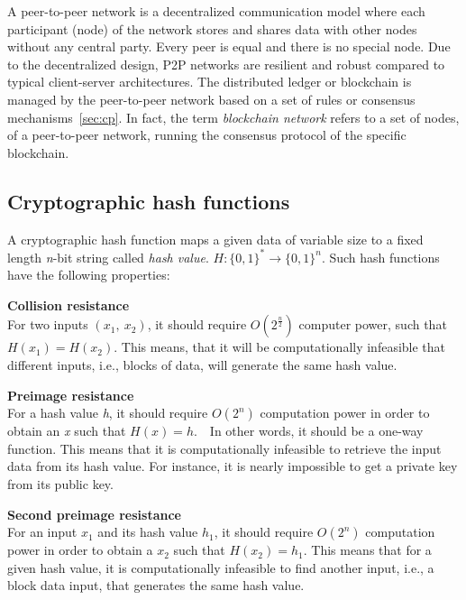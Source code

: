 \documentclass[11pt,a4paper]{report}
\begin{document}
A peer-to-peer network\cite{book:masteringBTCp2p}\cite{wiki:Peer-to-peer} is a decentralized communication model where each participant (node) of the network stores and shares data with other nodes without any central party. Every peer is equal and there is no special node. Due to the decentralized design, P2P networks are resilient and robust compared to typical client-server architectures. The distributed ledger or blockchain is managed by the peer-to-peer network based on a set of rules or consensus mechanisms~\ref{sec:cp}. In fact, the term \emph{blockchain network} refers to a set of nodes, of a peer-to-peer network, running the consensus protocol of the specific blockchain.


\subsection{Cryptographic hash functions}\label{sec:chf}
A cryptographic hash function\cite{chf}\cite{book:chf} maps a given data of variable size to a fixed length \emph{n}-bit string called \textit{hash value}. $ H : \{0,1\}^* \to \{0,1\}^n $. Such hash functions have the following properties:
\begin{description}		
	\item \textbf{Collision resistance}\\ For two inputs $(x_1,~x_2)$, it should require $ O(2^\frac{n}{2})$ computer power, such that $H(x_1) = H(x_2)$. This means, that it will be computationally infeasible that different inputs, i.e., blocks of data, will generate the same hash value.
	\item \textbf{Preimage resistance}\\ For a hash value \emph{h}, it should require $ O(2^n) $ computation power in order to obtain an \emph{x} such that $ H(x)=h $.~~In other words, it should be a one-way function. 
	This means that it is computationally infeasible to retrieve the input data from its hash value. For instance, it is nearly impossible to get a private key from its public key.	
	\item \textbf{Second preimage resistance}\\ For an input $x_1$ and its hash value $h_1$, it should require $ O(2^n) $ computation power in order to obtain a $x_2$ such that $H(x_2)=h_1.$ This means that for a given hash value, it is computationally infeasible to find another input, i.e., a block data input, that generates the same hash value. 	
\end{description}
\end{document}
